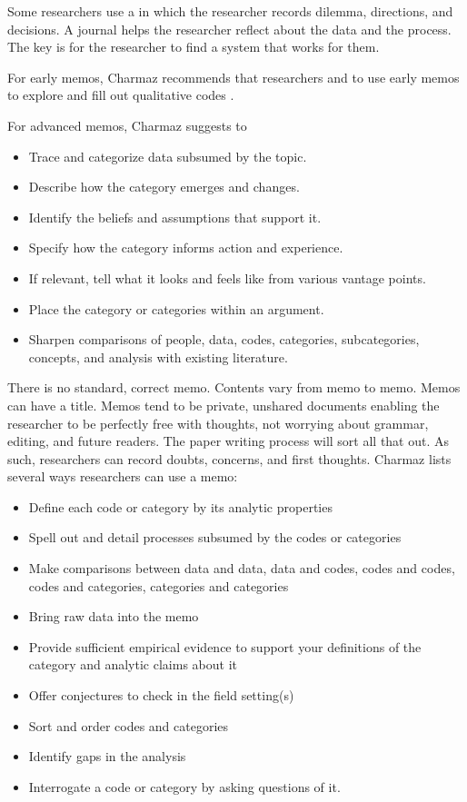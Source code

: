 Some researchers use a  in which the researcher records dilemma, directions, and decisions. A journal helps the researcher reflect about the data and the process.  The key is for the researcher to find a system that works for them.

For early memos, Charmaz recommends that researchers  and to {use early memos to explore and fill out qualitative codes} \cite{Charmaz}. 

For advanced memos, Charmaz suggests to
\begin{itemize}
\item Trace and categorize data subsumed by the topic.
\item Describe how the category emerges and changes. 
\item Identify the beliefs and assumptions that support it. 
\item Specify how the category informs action and experience. 
\item If relevant, tell what it looks and feels like from various vantage points. 
\item Place the category or categories within an argument. 
\item Sharpen comparisons of people, data, codes, categories, subcategories, concepts, and analysis with existing literature. \cite{Charmaz}
\end{itemize}

There is no standard, correct memo. Contents vary from memo to memo. Memos can have a title. Memos tend to be private, unshared documents enabling the researcher to be perfectly free with thoughts, not worrying about grammar, editing, and future readers. The paper writing process will sort all that out. As such, researchers can record doubts, concerns, and first thoughts. Charmaz lists several ways researchers can use a memo:
\begin{itemize}
\item Define each code or category by its analytic properties
\item Spell out and detail processes subsumed by the codes or categories
\item Make comparisons between data and data, data and codes, codes and codes, codes and categories, categories and categories
\item Bring raw data into the memo
\item Provide sufficient empirical evidence to support your definitions of the category and analytic claims about it
\item Offer conjectures to check in the field setting(s)
\item Sort and order codes and categories
\item Identify gaps in the analysis
\item Interrogate a code or category by asking questions of it. \cite{Charmaz}
\end{itemize}

